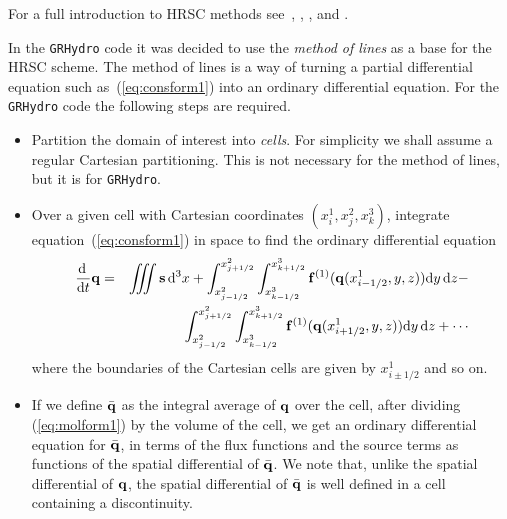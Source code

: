 \documentclass{article}
\begin{document}
For a full introduction to HRSC methods see~\cite{laney}, \cite{toro},
\cite{leveque}, \cite{livrevsrrfd} and \cite{livrevgrrfd}.

In the {\tt GRHydro} code it was decided to use the {\it method of lines} as a
base for the HRSC scheme. The method of lines is a way of turning a
partial differential equation such as~(\ref{eq:consform1}) into an
ordinary differential equation. For the {\tt GRHydro} code the following steps
are required.
\begin{itemize}
\item Partition the domain of interest into {\it cells}. For
  simplicity we shall assume a regular Cartesian partitioning. This is
  not necessary for the method of lines, but it is for {\tt GRHydro}.
\item Over a given cell with Cartesian coordinates $(x^1_i, x^2_j, x^3_k)$,
  integrate equation~(\ref{eq:consform1}) in space to find the
  ordinary differential equation
  \begin{eqnarray}
    \label{eq:molform1} \nonumber
    \frac{{\rm d} \,}{{\rm d} t} {\bf q} & = & \int \!\!\!\! \int \!\!\!\!
      \int {\bf s} \,{\rm d}^3 x + \int_{x^2_{j-1/2}}^{x^2_{j+1/2}}
    \int_{x^3_{k-1/2}}^{x^3_{k+1/2}} {\bf f}^{(1)} ({\bf q}
    (x^1_{i-1/2}, y, z)) {\rm d} y \, {\rm d} z - \\
    &&    \int_{x^2_{j-1/2}}^{x^2_{j+1/2}} 
    \int_{x^3_{k-1/2}}^{x^3_{k+1/2}} {\bf f}^{(1)} ({\bf q}
    (x^1_{i+1/2}, y, z))
    {\rm d} y \, {\rm d} z + \cdots
  \end{eqnarray}
  where the boundaries of the Cartesian cells are given by $x^1_{i \pm
  1/2}$ and so on.
\item If we define $\bar{\bf q}$ as the integral average of
  ${\bf q}$ over the cell, after dividing (\ref{eq:molform1}) by the volume of the cell, we get an ordinary
  differential equation for $\bar{\bf q}$, in terms of the flux functions and the
  source terms as functions of the spatial differential of $\bar{{\bf
  q}}$. We note that, unlike the spatial differential of ${\bf q}$,
  the spatial differential of $\bar{{\bf q}}$ is well defined in a
  cell containing a discontinuity. 
\end{itemize}
\end{document}
